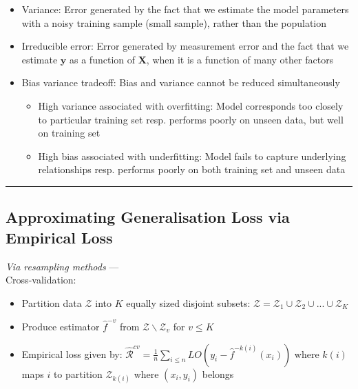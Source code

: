\begin{itemize}
    \item Variance: Error generated by the fact that we estimate the model parameters with a noisy training sample (small sample), rather than the population
    \item Irreducible error: Error generated by measurement error and the fact that we estimate $\boldsymbol{y}$ as a function of $\boldsymbol{X}$, when it is a function of many other factors
    \item Bias variance tradeoff: Bias and variance cannot be reduced simultaneously
    \begin{itemize}
        \item High variance associated with overfitting: Model corresponds too closely to particular training set resp. performs poorly on unseen data, but well on training set 
        \item High bias associated with underfitting: Model fails to capture underlying relationships resp. performs poorly on both training set and unseen data
    \end{itemize}    
\end{itemize}

{\color{black}\hrule height 0.001mm}

\subsection*{Approximating Generalisation Loss via Empirical Loss}

\emph{Via resampling methods} --- \\
Cross-validation:
\begin{itemize}
    \item Partition data $\mathcal{Z}$ into $K$ equally sized disjoint subsets: $\mathcal{Z} = \mathcal{Z}_1 \cup \mathcal{Z}_2 \cup ... \cup \mathcal{Z}_K$
    \item Produce estimator $\hat{f}^{-v}$ from $\mathcal{Z} \backslash \mathcal{Z}_v$ for $v \leq K$
    \item Empirical loss given by: $\hat{\mathcal{R}}^{cv} = \frac{1}{n} \sum_{i\leq n} LO(y_i - \hat{f}^{-k(i)} (x_i))$ where $k(i)$ maps $i$ to partition $\mathcal{Z}_{k(i)}$ where $(x_i,y_i)$ belongs
\end{itemize}

